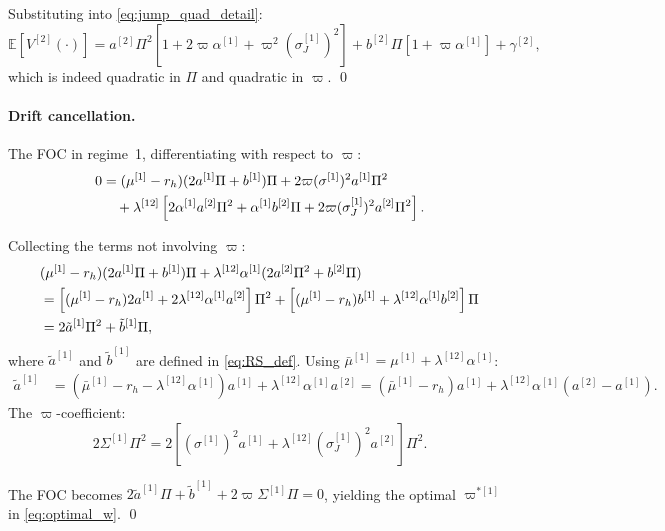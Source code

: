 \documentclass[11pt,a4paper]{article}
\numberwithin{equation}{section}
\newcommand{\E}{\mathbb{E}}
\begin{document}
\begin{appendices}
Substituting into \eqref{eq:jump_quad_detail}:
\begin{equation}
\E[V^{[2]}(\cdot)] = a^{[2]}\Pi^2[1 + 2\varpi\alpha^{[1]} + \varpi^2(\sigma_J^{[1]})^2] + b^{[2]}\Pi[1+\varpi\alpha^{[1]}] + \gamma^{[2]},
\end{equation}
which is indeed quadratic in $\Pi$ and quadratic in $\varpi$. \qed

\paragraph{Drift cancellation.}\label{app:drift_cancel}

The FOC in regime~1, differentiating with respect to $\varpi$:
\begin{align}
0 &= (\mu^{[1]} - r_h)(2a^{[1]}\Pi + b^{[1]})\Pi + 2\varpi(\sigma^{[1]})^2 a^{[1]} \Pi^2 \notag \\
&\quad + \lambda^{[12]}\left[2\alpha^{[1]} a^{[2]} \Pi^2 + \alpha^{[1]} b^{[2]} \Pi + 2\varpi(\sigma_J^{[1]})^2 a^{[2]} \Pi^2\right]. \label{eq:foc_full}
\end{align}

Collecting the terms not involving $\varpi$:
\begin{align}
& (\mu^{[1]} - r_h)(2a^{[1]}\Pi + b^{[1]})\Pi + \lambda^{[12]}\alpha^{[1]}(2a^{[2]}\Pi^2 + b^{[2]}\Pi) \notag \\
&= \left[(\mu^{[1]} - r_h)2a^{[1]} + 2\lambda^{[12]}\alpha^{[1]} a^{[2]}\right]\Pi^2 + \left[(\mu^{[1]}-r_{h})b^{[1]} + \lambda^{[12]}\alpha^{[1]} b^{[2]}\right]\Pi \notag \\
&= 2\tilde{a}^{[1]} \Pi^2 + \tilde{b}^{[1]} \Pi, \label{eq:tilde_collect}
\end{align}
where $\tilde{a}^{[1]}$ and $\tilde{b}^{[1]}$ are defined in \eqref{eq:RS_def}. Using $\bar{\mu}^{[1]} = \mu^{[1]} + \lambda^{[12]}\alpha^{[1]}$:
\begin{align}
\tilde{a}^{[1]} &= (\bar{\mu}^{[1]} - r_h - \lambda^{[12]}\alpha^{[1]})a^{[1]} + \lambda^{[12]}\alpha^{[1]} a^{[2]} = (\bar{\mu}^{[1]}-r_h)a^{[1]} + \lambda^{[12]}\alpha^{[1]}(a^{[2]} - a^{[1]}). \label{eq:tilde_a_expand}
\end{align}
The $\varpi$-coefficient:
\begin{equation}
2\Sigma^{[1]}\Pi^2 = 2\left[(\sigma^{[1]})^2 a^{[1]} + \lambda^{[12]}(\sigma_J^{[1]})^2 a^{[2]}\right]\Pi^2. \label{eq:S_coeff}
\end{equation}

The FOC becomes $2\tilde{a}^{[1]}\Pi + \tilde{b}^{[1]} + 2\varpi \Sigma^{[1]} \Pi = 0$, yielding the optimal $\varpi^{*[1]}$ in \eqref{eq:optimal_w}. \qed



\end{appendices}
\end{document}
